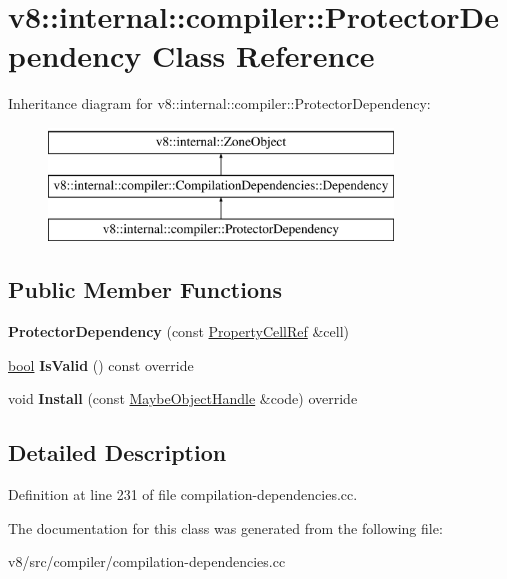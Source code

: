 \hypertarget{classv8_1_1internal_1_1compiler_1_1ProtectorDependency}{}\section{v8\+:\+:internal\+:\+:compiler\+:\+:Protector\+Dependency Class Reference}
\label{classv8_1_1internal_1_1compiler_1_1ProtectorDependency}
Inheritance diagram for v8\+:\+:internal\+:\+:compiler\+:\+:Protector\+Dependency\+:\begin{figure}[H]
\begin{center}
\leavevmode
\includegraphics[height=3.000000cm]{classv8_1_1internal_1_1compiler_1_1ProtectorDependency}
\end{center}
\end{figure}
\subsection*{Public Member Functions}
\begin{DoxyCompactItemize}
\item 
\mbox{\label{classv8_1_1internal_1_1compiler_1_1ProtectorDependency_af3c584d090327e0319931942a152e08a}} 
{\bfseries Protector\+Dependency} (const \mbox{\hyperlink{classv8_1_1internal_1_1compiler_1_1PropertyCellRef}{Property\+Cell\+Ref}} \&cell)
\item 
\mbox{\label{classv8_1_1internal_1_1compiler_1_1ProtectorDependency_adc5ff04d1899aa316c685d16e7c34139}} 
\mbox{\hyperlink{classbool}{bool}} {\bfseries Is\+Valid} () const override
\item 
\mbox{\label{classv8_1_1internal_1_1compiler_1_1ProtectorDependency_a98aa66fa6e3e2486eb1f67840930c228}} 
void {\bfseries Install} (const \mbox{\hyperlink{classv8_1_1internal_1_1MaybeObjectHandle}{Maybe\+Object\+Handle}} \&code) override
\end{DoxyCompactItemize}


\subsection{Detailed Description}


Definition at line 231 of file compilation-\/dependencies.\+cc.



The documentation for this class was generated from the following file\+:\begin{DoxyCompactItemize}
\item 
v8/src/compiler/compilation-\/dependencies.\+cc\end{DoxyCompactItemize}
